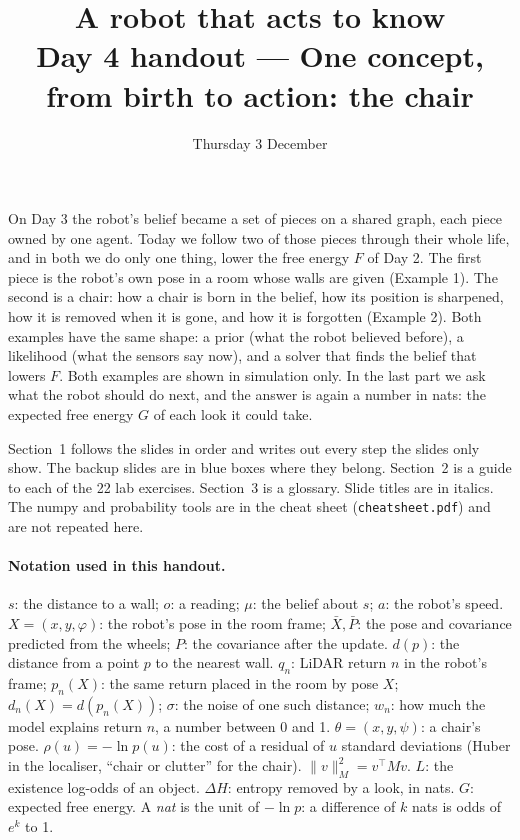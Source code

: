 \documentclass[11pt]{article}
\title{\textbf{A robot that acts to know}\\[0.3em]\large Day 4 handout --- One concept, from birth to action: the chair}
\author{}
\date{Thursday 3 December}
\begin{document}
\maketitle
\vspace{-2em}

\noindent
On Day 3 the robot's belief became a set of pieces on a shared graph, each piece owned by one agent. Today we follow two of those pieces through their whole life, and in both we do only one thing, lower the free energy $F$ of Day 2. The first piece is the robot's own pose in a room whose walls are given (Example 1). The second is a chair: how a chair is born in the belief, how its position is sharpened, how it is removed when it is gone, and how it is forgotten (Example 2). Both examples have the same shape: a prior (what the robot believed before), a likelihood (what the sensors say now), and a solver that finds the belief that lowers $F$. Both examples are shown in simulation only. In the last part we ask what the robot should do next, and the answer is again a number in nats: the expected free energy $G$ of each look it could take.

Section~1 follows the slides in order and writes out every step the slides only show. The backup slides are in blue boxes where they belong. Section~2 is a guide to each of the 22 lab exercises. Section~3 is a glossary. Slide titles are in italics. The numpy and probability tools are in the cheat sheet (\texttt{cheatsheet.pdf}) and are not repeated here.

\paragraph{Notation used in this handout.} $s$: the distance to a wall; $o$: a reading; $\mu$: the belief about $s$; $a$: the robot's speed. $X=(x,y,\varphi)$: the robot's pose in the room frame; $\bar X,\bar P$: the pose and covariance predicted from the wheels; $P$: the covariance after the update. $d(p)$: the distance from a point $p$ to the nearest wall. $q_n$: LiDAR return $n$ in the robot's frame; $p_n(X)$: the same return placed in the room by pose $X$; $d_n(X)=d(p_n(X))$; $\sigma$: the noise of one such distance; $w_n$: how much the model explains return $n$, a number between 0 and 1. $\theta=(x,y,\psi)$: a chair's pose. $\rho(u)=-\ln p(u)$: the cost of a residual of $u$ standard deviations (Huber in the localiser, ``chair or clutter'' for the chair). $\|v\|^2_M=v^\top M v$. $L$: the existence log-odds of an object. $\Delta H$: entropy removed by a look, in nats. $G$: expected free energy. A \emph{nat} is the unit of $-\ln p$: a difference of $k$ nats is odds of $e^{k}$ to 1.
\end{document}
